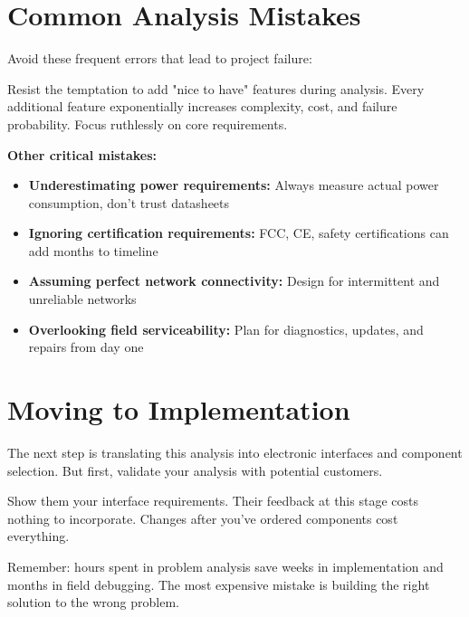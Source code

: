\section{Common Analysis Mistakes}

Avoid these frequent errors that lead to project failure:

\begin{tcolorbox}[colback=red!10,colframe=red!75!black,title=Warning: Feature Creep]
Resist the temptation to add "nice to have" features during analysis. Every additional feature exponentially increases complexity, cost, and failure probability. Focus ruthlessly on core requirements.
\end{tcolorbox}

\textbf{Other critical mistakes:}
\begin{itemize}
\item \textbf{Underestimating power requirements:} Always measure actual power consumption, don't trust datasheets
\item \textbf{Ignoring certification requirements:} FCC, CE, safety certifications can add months to timeline
\item \textbf{Assuming perfect network connectivity:} Design for intermittent and unreliable networks
\item \textbf{Overlooking field serviceability:} Plan for diagnostics, updates, and repairs from day one
\end{itemize}

\section{Moving to Implementation}

The next step is translating this analysis into electronic interfaces and component selection. But first, validate your analysis with potential customers. 

Show them your interface requirements. Their feedback at this stage costs nothing to incorporate. Changes after you've ordered components cost everything.

Remember: hours spent in problem analysis save weeks in implementation and months in field debugging. The most expensive mistake is building the right solution to the wrong problem.